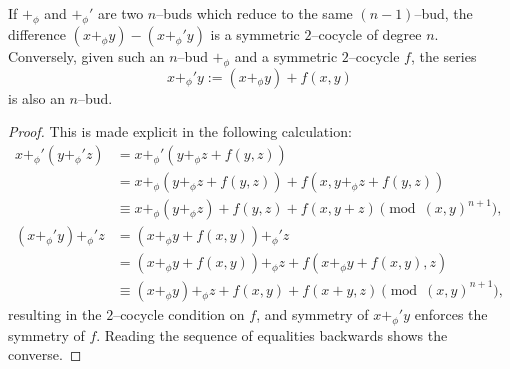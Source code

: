 \begin{lemma}\label{TwoNBudsDifferByACocycle}
If \(+_\phi\) and \(+_\phi'\) are two \(n\)--buds which reduce to the same \((n-1)\)--bud, the difference \((x +_\phi y) - (x +_\phi' y)\) is a symmetric \(2\)--cocycle of degree \(n\).  Conversely, given such an \(n\)--bud \(+_\phi\) and a symmetric \(2\)--cocycle \(f\), the series \[x +_\phi' y := (x +_\phi y) + f(x, y)\] is also an \(n\)--bud.
\end{lemma}
\begin{proof}
This is made explicit in the following calculation:
\begin{align*}
x +_\phi' (y +_\phi' z) & = x +_\phi' (y +_\phi z + f(y, z)) \\
& = x +_\phi (y +_\phi z + f(y, z)) + f(x, y +_\phi z + f(y, z)) \\
& \equiv x +_\phi (y +_\phi z) + f(y, z) + f(x, y + z) \pmod{(x, y)^{n+1}}, \\
(x +_\phi' y) +_\phi' z & = (x +_\phi y + f(x, y)) +_\phi' z \\
& = (x +_\phi y + f(x, y)) +_\phi z + f(x +_\phi y + f(x, y), z) \\
& \equiv (x +_\phi y) +_\phi z + f(x, y) + f(x + y, z) \pmod{(x, y)^{n+1}},
\end{align*}
resulting in the \(2\)--cocycle condition on \(f\), and symmetry of \(x +_\phi' y\) enforces the symmetry of \(f\).  Reading the sequence of equalities backwards shows the converse.
\end{proof}

